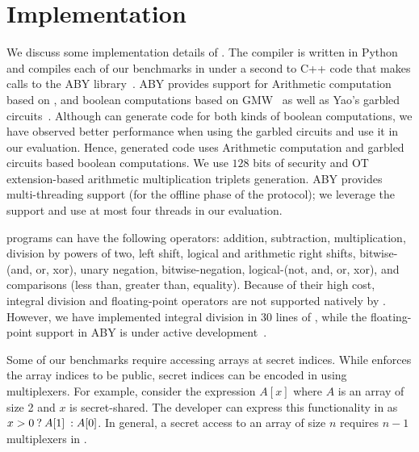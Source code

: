 \vspace{-0.1in}
\section{Implementation}
\label{sec:impl}
We discuss some  implementation details of \tool.
The  \tool compiler is written in Python and
compiles each of our benchmarks in under a second to C++ code that
makes calls to the ABY
library~\cite{aby}. 
ABY provides support for Arithmetic computation based on \cite{autoS}, and boolean computations based on GMW~\cite{gmw} as well as Yao's garbled circuits~\cite{yao}. Although \tool can generate code for both kinds of boolean computations, we have observed better performance when using the garbled circuits
and use it in our evaluation. Hence, \tool generated code uses Arithmetic computation and garbled circuits based boolean computations.
We use $128$ bits of security and OT
extension-based arithmetic multiplication triplets generation. ABY
provides multi-threading support (for the offline phase of the \mpc
protocol); we leverage the support and use at most four threads in our
evaluation. 

\tool programs can have the following operators:
addition, subtraction, multiplication, division by powers of two, left
shift,
logical and arithmetic right shifts, bitwise-(and, or, xor), unary
negation, 
bitwise-negation, logical-(not, and, or, xor), and comparisons (less
than, greater than, equality).  
Because of their high cost, integral division and floating-point
operators are not supported natively by \tool. 
However, we have implemented integral division in 30 lines of \tool,
while the floating-point support in ABY is under active
development~\cite{ddkssz15}.

Some of our benchmarks require accessing arrays at secret
indices. While \tool enforces the array indices to be
public, secret indices can be encoded in \tool using multiplexers.
For example, consider the expression $A[x]$ where $A$ is an array of
size 2 and $x$ is secret-shared. The developer can express
this functionality in \tool as ${{x > 0}\:?\:{A[1]}\::{A[0]}}$. In general,
a secret access to an array of
size $n$ requires ${n}-1$ multiplexers in \tool.


